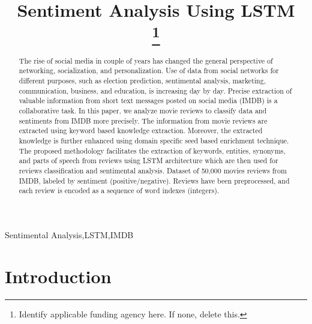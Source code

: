 \documentclass[conference]{IEEEtran}
\begin{document}
\title{Sentiment Analysis Using LSTM\\
\thanks{Identify applicable funding agency here. If none, delete this.}
}

\author{
}

\maketitle

\begin{abstract}
The rise of social media in couple of years has changed the general perspective of networking, socialization, and
personalization. Use of data from social networks for different purposes, such as election prediction, sentimental analysis, marketing, communication, business, and education, is increasing day by day. Precise extraction of valuable information from short text messages posted on social media (IMDB) is a collaborative task. In this paper, we analyze movie reviews to classify data and sentiments from IMDB more precisely. The information from movie reviews are extracted using keyword based knowledge extraction. Moreover, the extracted knowledge is further enhanced using domain specific seed based enrichment technique. The proposed methodology facilitates the extraction of keywords, entities, synonyms, and parts of speech from reviews using LSTM architecture which are then used for reviews classification and sentimental analysis. Dataset of 50,000 movies reviews from IMDB, labeled by sentiment (positive/negative). Reviews have been preprocessed, and each review is encoded as a sequence of word indexes (integers).
\end{abstract}

\begin{IEEEkeywords}
Sentimental Analysis,LSTM,IMDB
\end{IEEEkeywords}

\section{Introduction}
\end{document}
